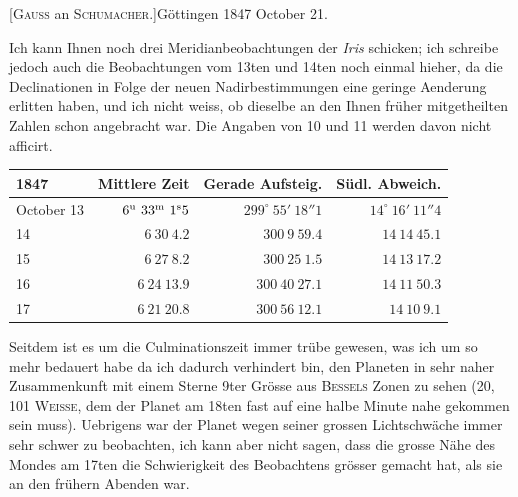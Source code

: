 \clearpage
\hypertarget{native-480-october21}{}
\begin{center}[\textsc{Gauss} an \textsc{Schumacher}.]\quad Göttingen 1847 October 21.\end{center}

Ich kann Ihnen noch drei Meridianbeobachtungen der \emph{Iris} schicken; ich schreibe jedoch auch die Beobachtungen vom 13ten und 14ten noch einmal hieher, da die Declinationen in Folge der neuen Nadirbestimmungen eine geringe Aenderung erlitten haben, und ich nicht weiss, ob dieselbe an den Ihnen früher mitgetheilten Zahlen schon angebracht war. Die Angaben von 10 und 11 werden davon nicht afficirt.

\begin{center}
\setlength{\tabcolsep}{4pt}
\begin{tabular}{l|r|r|r}
1847 & Mittlere Zeit & Gerade Aufsteig. & Südl. Abweich. \\\hline
October 13 & $6^{\rm u}\ 33^{\rm m}\ 1^{\rm s}5$ & $299^\circ\ 55'\ 18''1$ & $14^\circ\ 16'\ 11''4$ \\
\hfill 14 & $6\ 30\ 4.2$ & $300\ 9\ 59.4$ & $14\ 14\ 45.1$ \\
\hfill 15 & $6\ 27\ 8.2$ & $300\ 25\ 1.5$ & $14\ 13\ 17.2$ \\
\hfill 16 & $6\ 24\ 13.9$ & $300\ 40\ 27.1$ & $14\ 11\ 50.3$ \\
\hfill 17 & $6\ 21\ 20.8$ & $300\ 56\ 12.1$ & $14\ 10\ 9.1$ \\
\end{tabular}
\end{center}

Seitdem ist es um die Culminationszeit immer trübe gewesen, was ich um so mehr bedauert habe da ich dadurch verhindert bin, den Planeten in sehr naher Zusammenkunft mit einem Sterne 9ter Grösse aus \textsc{Bessels} Zonen zu sehen (20, 101 \textsc{Weisse}, dem der Planet am 18ten fast auf eine halbe Minute nahe gekommen sein muss). Uebrigens war der Planet wegen seiner grossen Lichtschwäche immer sehr schwer zu beobachten, ich kann aber nicht sagen, dass die grosse Nähe des Mondes am 17ten die Schwierigkeit des Beobachtens grösser gemacht hat, als sie an den frühern Abenden war.
